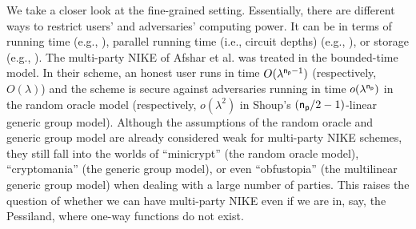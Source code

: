 We take a closer look at the fine-grained setting. Essentially, there are different ways to restrict users' and adversaries' computing power. It can be in terms of running time (e.g., \cite{Merkle78,TCC:BihGorIsh08,EC:BrzCou22}), parallel running time (i.e., circuit depths) (e.g., \cite{Has87,C:DegVaiVas16,TCC:CamGen18}), or storage (e.g., \cite{JC:Maurer92,C:CacMau97,EC:DodQuaWic23}).
The multi-party NIKE of Afshar et al. was treated in the bounded-time model. In their scheme, an honest user runs in time $O(\lambda^{\mathsf{n_p}-1})$ (respectively, $O(\lambda)$) and the scheme is secure against adversaries running in time $o(\lambda^{\mathsf{n_p}})$ in the random oracle model (respectively, $o(\lambda^2)$ in Shoup's $(\mathsf{n_p}/2-1)$-linear generic group model). Although the assumptions of the random oracle and generic group model are already considered weak for multi-party NIKE schemes, they still fall into the worlds of ``minicrypt'' (the random oracle model), ``cryptomania'' (the generic group model), or even ``obfustopia'' (the multilinear generic group model) when dealing with a large number of parties. This raises the question of whether we can have multi-party NIKE even if we are in, say, the Pessiland, where one-way functions do not exist.

